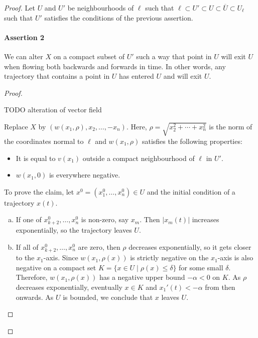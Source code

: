 \begin{proof}
Let $U$ and $U'$ be neighbourhoods of $\ell$ such that $\ell \subset U' \subset U \subset \overline{U} \subset U_\ell$ such that $U'$ satisfies the conditions of the previous assertion.

\paragraph{Assertion 2}
We can alter $X$ on a compact subset of $U'$ such a way that point in $U$ will exit $U$ when flowing both backwards and forwards in time.
In other words, any trajectory that contains a point in $U$ has entered $U$  and will exit $U$.

\begin{proof}
    \begin{marginfigure}
        \centering
        \caption{TODO alteration of vector field}
        \label{fig:alteration-of-vector-field}
    \end{marginfigure}
    Replace $X$ by  $(w(x_1, \rho), x_2, \ldots, -x_n)$.
    Here, $\rho = \sqrt{x_2^2 + \cdots + x_n^2}$ is the norm of the coordinates normal to $\ell$ and $w(x_1, \rho)$ satisfies the following properties:
    \begin{itemize}
        \item It is equal to $v(x_1)$ outside a compact neighbourhood of  $ \ell$ in $U'$.
        \item $w(x_1, 0)$ is everywhere negative.
    \end{itemize}
    To prove the claim, let $x^0 = (x_1^{0}, \ldots, x_n^{0}) \in U$ and the initial condition of a trajectory $x(t)$.
    \begin{enumerate}[(a)]
        \item If one of $x_{k+2}^{0}, \ldots, x_n^{0}$ is non-zero, say $x_m$. Then $|x_m(t)|$ increases exponentially, so the trajectory leaves $U$.
        \item If all of $x_{k+2}^{0}, \ldots, x_n^{0}$ are zero, then $\rho$ decreases exponentially, so it gets closer to the $x_1$-axis.
            Since $w(x_1, \rho(x))$ is strictly negative on the $ x_1$-axis is also negative on a compact set $K = \{ x \in U  \mid  \rho(x) \le  \delta\} $ for some small $\delta$.
            Therefore, $ w(x_1, \rho(x))$ has a negative upper bound $-\alpha < 0$ on $K$.
            As $\rho$ decreases exponentially, eventually  $x \in K$ and $x_1'(t) < -\alpha$ from then onwards.
            As $U$ is bounded, we conclude that $x$ leaves $U$. \qedhere
    \end{enumerate}
\end{proof}

\end{proof}
